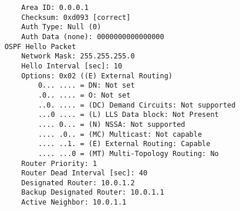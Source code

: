 \begin{lstlisting}
        Area ID: 0.0.0.1
        Checksum: 0xd093 [correct]
        Auth Type: Null (0)
        Auth Data (none): 0000000000000000
    OSPF Hello Packet
        Network Mask: 255.255.255.0
        Hello Interval [sec]: 10
        Options: 0x02 ((E) External Routing)
            0... .... = DN: Not set
            .0.. .... = O: Not set
            ..0. .... = (DC) Demand Circuits: Not supported
            ...0 .... = (L) LLS Data block: Not Present
            .... 0... = (N) NSSA: Not supported
            .... .0.. = (MC) Multicast: Not capable
            .... ..1. = (E) External Routing: Capable
            .... ...0 = (MT) Multi-Topology Routing: No
        Router Priority: 1
        Router Dead Interval [sec]: 40
        Designated Router: 10.0.1.2
        Backup Designated Router: 10.0.1.1
        Active Neighbor: 10.0.1.1
\end{lstlisting}


